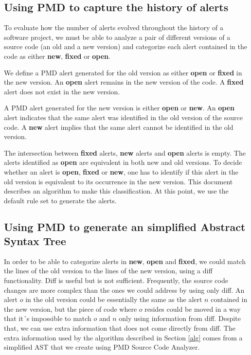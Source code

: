 \documentclass[
]{article}
\begin{document}
\normalsize

\subsection{Using PMD to capture the history of alerts}\label{history}

To evaluate how the number of alerts evolved throughout the history of a
software project, we must be able to analyze a pair of different
versions of a source code (an old and a new version) and categorize each
alert contained in the code as either \textbf{new}, \textbf{fixed} or
\textbf{open}.

We define a PMD alert generated for the old version as either
\textbf{open} or \textbf{fixed} in the new version. An \textbf{open}
alert remains in the new version of the code. A \textbf{fixed} alert
does not exist in the new version.

A PMD alert generated for the new version is either \textbf{open} or
\textbf{new}. An \textbf{open} alert indicates that the same alert was
identified in the old version of the source code. A \textbf{new} alert
implies that the same alert cannot be identified in the old version.

The intersection between \textbf{fixed} alerts, \textbf{new} alerts and
\textbf{open} alerts is empty. The alerts identified as \textbf{open}
are equivalent in both new and old versions. To decide whether an alert
is \textbf{open}, \textbf{fixed} or \textbf{new}, one has to identify if
this alert in the old version is equivalent to its occurrence in the new
version. This document describes an algorithm to make this
classification. At this point, we use the default rule set to generate
the alerts.

\subsection{Using PMD to generate an simplified Abstract Syntax Tree }\label{ast}

In order to be able to categorize alerts in \textbf{new}, \textbf{open}
and \textbf{fixed}, we could match the lines of the old version to the
lines of the new version, using a diff functionality. Diff is useful but
is not sufficient. Frequently, the source code changes are more complex
than the ones we could address by using only diff. An alert \(o\) in the
old version could be essentially the same as the alert \(n\) contained
in the new version, but the piece of code where \(o\) resides could be
moved in a way that it´s impossible to match \(o\) and \(n\) only using
information from diff. Despite that, we can use extra information that
does not come directly from diff. The extra information used by the
algorithm described in Section \ref{alg} comes from a simplified AST
that we create using PMD Source Code Analyzer.
\end{document}
